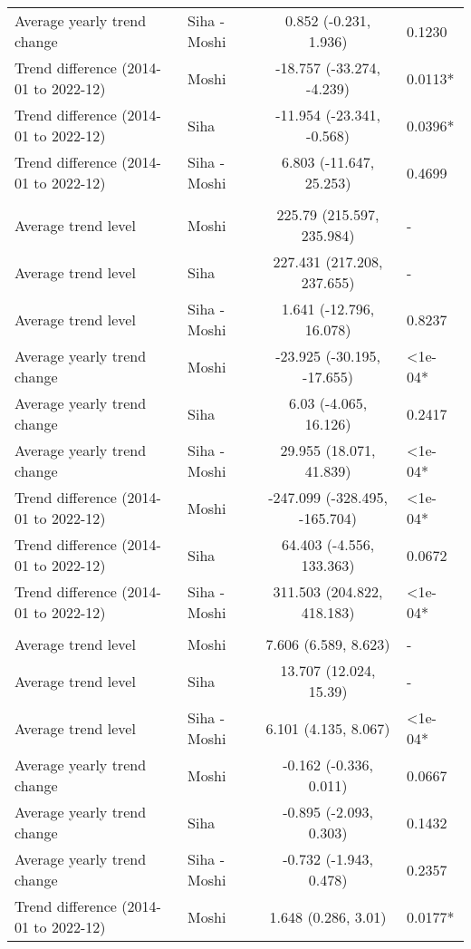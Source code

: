 \begin{longtable}{l|lcl}
Average yearly trend change & Siha - Moshi & 0.852 (-0.231, 1.936) & 0.1230 \\ 
Trend difference (2014-01 to 2022-12) & Moshi & -18.757 (-33.274, -4.239) & 0.0113* \\ 
Trend difference (2014-01 to 2022-12) & Siha & -11.954 (-23.341, -0.568) & 0.0396* \\ 
Trend difference (2014-01 to 2022-12) & Siha - Moshi & 6.803 (-11.647, 25.253) & 0.4699 \\ 
\midrule\addlinespace[2.5pt]
\multicolumn{4}{l}{Skin Infection - Fungal} \\[2.5pt] 
\midrule\addlinespace[2.5pt]
Average trend level & Moshi & 225.79 (215.597, 235.984) & - \\ 
Average trend level & Siha & 227.431 (217.208, 237.655) & - \\ 
Average trend level & Siha - Moshi & 1.641 (-12.796, 16.078) & 0.8237 \\ 
Average yearly trend change & Moshi & -23.925 (-30.195, -17.655) & <1e-04* \\ 
Average yearly trend change & Siha & 6.03 (-4.065, 16.126) & 0.2417 \\ 
Average yearly trend change & Siha - Moshi & 29.955 (18.071, 41.839) & <1e-04* \\ 
Trend difference (2014-01 to 2022-12) & Moshi & -247.099 (-328.495, -165.704) & <1e-04* \\ 
Trend difference (2014-01 to 2022-12) & Siha & 64.403 (-4.556, 133.363) & 0.0672 \\ 
Trend difference (2014-01 to 2022-12) & Siha - Moshi & 311.503 (204.822, 418.183) & <1e-04* \\ 
\midrule\addlinespace[2.5pt]
\multicolumn{4}{l}{Snake and Insect Bites} \\[2.5pt] 
\midrule\addlinespace[2.5pt]
Average trend level & Moshi & 7.606 (6.589, 8.623) & - \\ 
Average trend level & Siha & 13.707 (12.024, 15.39) & - \\ 
Average trend level & Siha - Moshi & 6.101 (4.135, 8.067) & <1e-04* \\ 
Average yearly trend change & Moshi & -0.162 (-0.336, 0.011) & 0.0667 \\ 
Average yearly trend change & Siha & -0.895 (-2.093, 0.303) & 0.1432 \\ 
Average yearly trend change & Siha - Moshi & -0.732 (-1.943, 0.478) & 0.2357 \\ 
Trend difference (2014-01 to 2022-12) & Moshi & 1.648 (0.286, 3.01) & 0.0177* \\ 

\end{longtable}
